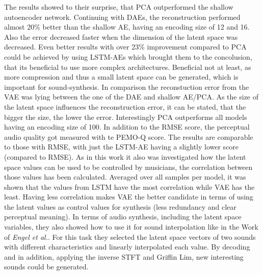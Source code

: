 The results showed to their surprise, that PCA outperformed the shallow autoencoder network. Continuing with DAEs, the reconstruction performed almost 20\% better than the shallow AE, having an encoding size of 12 and 16. Also the error decreased faster when the dimension of the latent space was decreased. Even better results with over 23\% improvement compared to PCA could be achieved by using LSTM-AEs which brought them to the concolusion, that its beneficial to use more complex architectures. Beneficial not at least, as more compression and thus a small latent space can be generated, which is important for sound-synthesis. In comparison the reconstuction error from the VAE was lying between the one of the DAE and shallow AE/PCA. As the size of the latent space influences the reconstruction error, it can be stated, that the bigger the size, the lower the error. Interestingly PCA outperforms all models having an encoding size of 100. In addition to the RMSE score, the perceptual audio quality got measured with te PEMO-Q score. The results are comparable to those with RMSE, with just the LSTM-AE having a slightly lower score (compared to RMSE). As in this work it also was investigated how the latent space values can be used to be controlled by musicians, the correlation between those values has been calculated. Averaged over all samples per model, it was shown that the values from LSTM have the most correlation while VAE has the least. Having less correlation makes VAE the better candidate in terms of using the latent values as control values for synthesis (less redundancy and clear perceptual meaning). In terms of audio synthesis, including the latent space variables, they also showed how to use it for sound interpolation like in the Work of \textit{Engel et al.}. For this task they selected the latent space vectors of two sounds with different characteristics and linearly interpolated each value. By decoding and in addition, applying the inverse STFT and Griffin Lim, new interesting sounds could be generated. 

